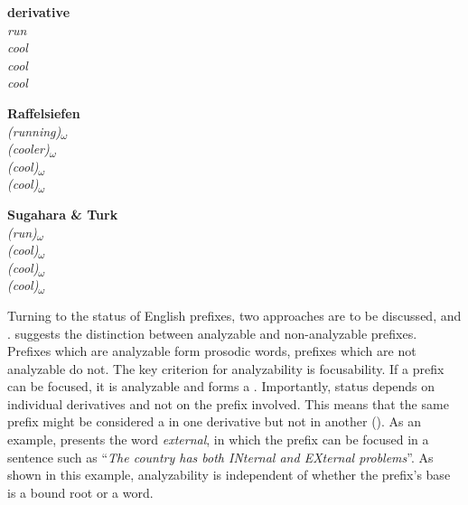 \begin{multicols}{3}
	
	\begin{exe}
		
		\ex		
		\textbf{derivative}	\\
		\textit{run}	\\
		\textit{cool} 	\\
		\textit{cool}\\
		\textit{cool} \\			
		\columnbreak 
		
		\textbf{Raffelsiefen }	\\
		\textit{(running)\textsubscript{$\omega$}} 	\\
		\textit{(cooler)\textsubscript{$\omega$}} \\
		\textit{(cool)\textsubscript{$\omega$}} \\
		\textit{(cool)\textsubscript{$\omega$}} \\
		\columnbreak
		
		\textbf{Sugahara \& Turk}	\\
		\textit{(run)\textsubscript{$\omega$}} \\
		\textit{(cool)\textsubscript{$\omega$}} 	\\	
		\textit{(cool)\textsubscript{$\omega$}}\\
		\textit{(cool)\textsubscript{$\omega$}}	\\
		
	\end{exe}
	
\end{multicols}


Turning to the  status of English prefixes, two approaches are to be discussed, \cite{Wennerstrom.1993} and \cite{Raffelsiefen.1999}. \cite{Wennerstrom.1993} suggests the distinction between analyzable and non-analyzable prefixes. Prefixes which are analyzable form prosodic words, prefixes which are not analyzable do not. The key criterion for analyzability is focusability. If a prefix can be focused, it is analyzable and forms a . 
Importantly,  status depends on individual derivatives and not on the prefix involved. This means that the same prefix might be considered a  in one derivative but not in another (\citealt[314]{Wennerstrom.1993}). 
As an example, \citet[311]{Wennerstrom.1993} presents the word \textit{external}, in which the prefix  can be focused in a sentence such as ``\textit{The country has both INternal and EXternal problems}''. As shown in this example, analyzability is independent of whether the prefix's base is a bound root or a word. 


